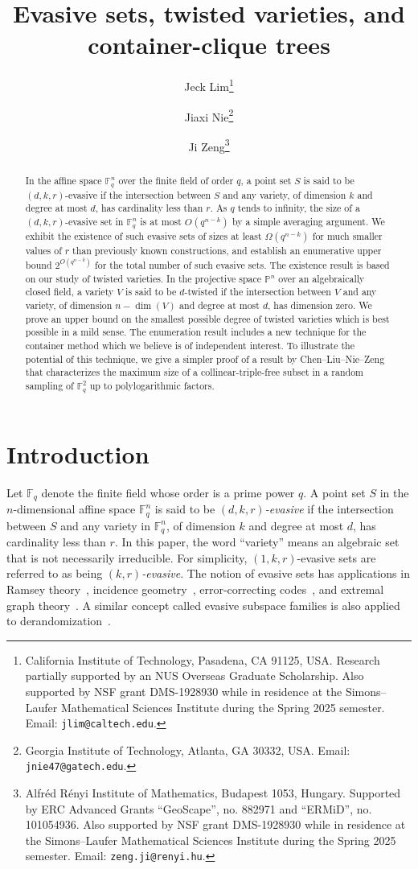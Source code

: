 \documentclass[11pt]{article}
\date{}
\title{Evasive sets, twisted varieties, and container-clique trees}
\author{Jeck Lim\thanks{California Institute of Technology, Pasadena, CA 91125, USA. Research partially supported by an NUS Overseas Graduate Scholarship. Also supported by NSF grant DMS-1928930 while in residence at the Simons--Laufer Mathematical Sciences Institute during the Spring 2025 semester. Email: {\tt jlim@caltech.edu}.} \and Jiaxi Nie\thanks{Georgia Institute of Technology, Atlanta, GA 30332, USA. Email: {\tt jnie47@gatech.edu}.} \and Ji Zeng\thanks{Alfréd Rényi Institute of Mathematics, Budapest 1053, Hungary. Supported by ERC Advanced Grants ``GeoScape'', no. 882971 and ``ERMiD'', no. 101054936. Also supported by NSF grant DMS-1928930 while in residence at the Simons--Laufer Mathematical Sciences Institute during the Spring 2025 semester. Email: {\tt zeng.ji@renyi.hu}.}}
\date{}
\theoremstyle{definition}
\begin{document}
\maketitle
\begin{abstract}

In the affine space $\mathbb{F}_q^n$ over the finite field of order $q$, a point set $S$ is said to be $(d,k,r)$-evasive if the intersection between $S$ and any variety, of dimension $k$ and degree at most $d$, has cardinality less than $r$. As $q$ tends to infinity, the size of a $(d,k,r)$-evasive set in $\mathbb{F}_q^n$ is at most $O\left(q^{n-k}\right)$ by a simple averaging argument. We exhibit the existence of such evasive sets of sizes at least $\Omega\left(q^{n-k}\right)$ for much smaller values of $r$ than previously known constructions, and establish an enumerative upper bound $2^{O(q^{n-k})}$ for the total number of such evasive sets. The existence result is based on our study of twisted varieties. In the projective space $\mathbb{P}^n$ over an algebraically closed field, a variety $V$ is said to be $d$-twisted if the intersection between $V$ and any variety, of dimension $n - \dim(V)$ and degree at most $d$, has dimension zero. We prove an upper bound on the smallest possible degree of twisted varieties which is best possible in a mild sense. The enumeration result includes a new technique for the container method which we believe is of independent interest. To illustrate the potential of this technique, we give a simpler proof of a result by Chen--Liu--Nie--Zeng that characterizes the maximum size of a collinear-triple-free subset in a random sampling of $ \mathbb{F}_q^2$ up to polylogarithmic factors.

\end{abstract}

\section{Introduction}

Let $\mathbb{F}_q$ denote the finite field whose order is a prime power $q$. A point set $S$ in the $n$-dimensional affine space $\mathbb{F}_q^n$ is said to be \textit{$(d,k,r)$-evasive} if the intersection between $S$ and any variety in $\mathbb{F}_q^n$, of dimension $k$ and degree at most $d$, has cardinality less than $r$. In this paper, the word ``variety'' means an algebraic set that is not necessarily irreducible. For simplicity, $(1,k,r)$-evasive sets are referred to as being \textit{$(k,r)$-evasive}. The notion of evasive sets has applications in Ramsey theory~\cite{pudlak2004pseudorandom}, incidence geometry~\cite{sudakov2024evasive,milojevic2024incidence}, error-correcting codes~\cite{guruswami2011linear,dvir2012subspace}, and extremal graph theory~\cite{blagojevic2013turan,bukh2024extremal}. A similar concept called evasive subspace families is also applied to derandomization~\cite{guo2024variety}.
\end{document}
